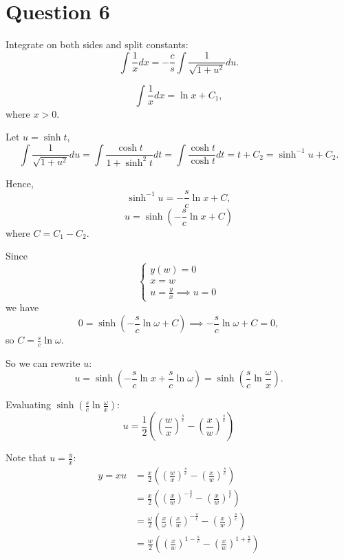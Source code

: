 \documentclass[12pt,a4paper]{article}
\begin{document}
\section*{Question 6}
\begin{solution}
Integrate on both sides and split constants:
\[\int \frac{1}{x}dx=-\frac{c}{s} \int \frac{1}{\sqrt{1+u^2}}du.\]

\[
\int \frac{1}{x}dx = \ln{x} + C_1, 
\]
where $x > 0$.

Let $u = \sinh{t}$,
\[
\int \frac{1}{\sqrt{1+u^2}}du = \int \frac{\cosh{t}}{1+\sinh^2{t}}dt = \int\frac{\cosh{t}}{\cosh{t}}dt = t + C_2 = \sinh^{-1}{u} + C_2.
\]

Hence, 
\[
\sinh^{-1}{u} = -\frac{s}{c}\ln{x} + C,
\]
\[
u = \sinh{\left(-\frac{s}{c}\ln{x} + C\right)}
\]
where $C = C_1-C_2$.

Since 
\[
\begin{cases}
    y(w) = 0\\
    x = w\\
    u = \frac{y}{x}\implies u = 0
\end{cases}
\]
we have
\[
0 = \sinh{\left(-\frac{s}{c}\ln{\omega} + C\right)}
\implies 
-\frac{s}{c}\ln{\omega} + C = 0,
\]
so $C = \frac{s}{c}\ln{\omega}$.

So we can rewrite $u$:
\[
u = \sinh{\left(-\frac{s}{c}\ln{x} + \frac{s}{c}\ln{\omega}\right)}
=\sinh{\left(\frac{s}{c}\ln{\frac{\omega}{x}}\right)}.
\]

Evaluating $\sinh{\left(\frac{s}{c}\ln{\frac{\omega}{x}}\right)}$:
\[
u=\frac{1}{2}\left(\left(\frac{w}{x}\right)^{\frac{s}{c}}-\left(\frac{x}{w}\right)^{\frac{s}{c}}\right)
\]

Note that $ u = \frac{y}{x}$:
\[
\begin{aligned}
    y = xu &= \frac{x}{2}\left(\left(\frac{w}{x}\right)^{\frac{s}{c}}-\left(\frac{x}{w}\right)^{\frac{s}{c}}\right)\\
    &=\frac{x}{2}\left(\left(\frac{x}{w}\right)^{-\frac{s}{c}}-\left(\frac{x}{w}\right)^{\frac{s}{c}}\right)\\
    &=\frac{\omega}{2}\left(\frac{x}{\omega}\left(\frac{x}{w}\right)^{-\frac{s}{c}}-\left(\frac{x}{w}\right)^{\frac{s}{c}}\right)\\
    &=\frac{w}{2}\left(\left(\frac{x}{w}\right)^{1-\frac{s}{c}}-\left(\frac{x}{w}\right)^{1+\frac{s}{c}}\right)
\end{aligned}
\]

\end{solution}
\end{document}
